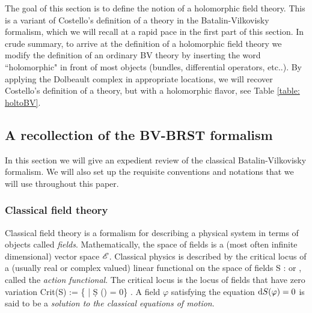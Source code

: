 \documentclass[10pt]{amsart}
\begin{document}
The goal of this section is to define the notion of a holomorphic field theory. 
This is a variant of Costello's definition of a theory in the Batalin-Vilkovisky formalism, which we will recall at a rapid pace in the first part of this section.
In crude summary, to arrive at the definition of a holomorphic field theory we modify the definition of an ordinary BV theory by inserting the word ``holomorphic" in front of most objects (bundles, differential operators, etc..).
By applying the Dolbeault complex in appropriate locations, we will recover Costello's definition of a theory, but with a holomorphic flavor, see Table \ref{table: holtoBV}. 

\subsection{A recollection of the BV-BRST formalism}

In this section we will give an expedient review of the classical Batalin-Vilkovisky formalism.
We will also set up the requisite conventions and notations that we will use throughout this paper. 

\subsubsection{Classical field theory} \label{sec: classical bv}

Classical field theory is a formalism for describing a physical system in terms of objects called {\em fields}. 
Mathematically, the space of fields is a (most often infinite dimensional) vector space $\mathscr E$. 
Classical physics is described by the critical locus of a (usually real or complex valued) linear functional on the space of fields 
\be\label{actionfnl}
S : \sE \to \RR \;\; {\rm or} \;\; \CC,
\ee
called the {\em action functional}. 
The critical locus is the locus of fields that have zero variation
\be
{\rm Crit}(S) := \{\varphi \in \sE \; | \; \d S (\varphi) = 0\} .
\ee
A field $\varphi$ satisfying the equation ${\rm d} S (\varphi) = 0$ is said to be a {\em solution to the classical equations of motion}. 
\end{document}
